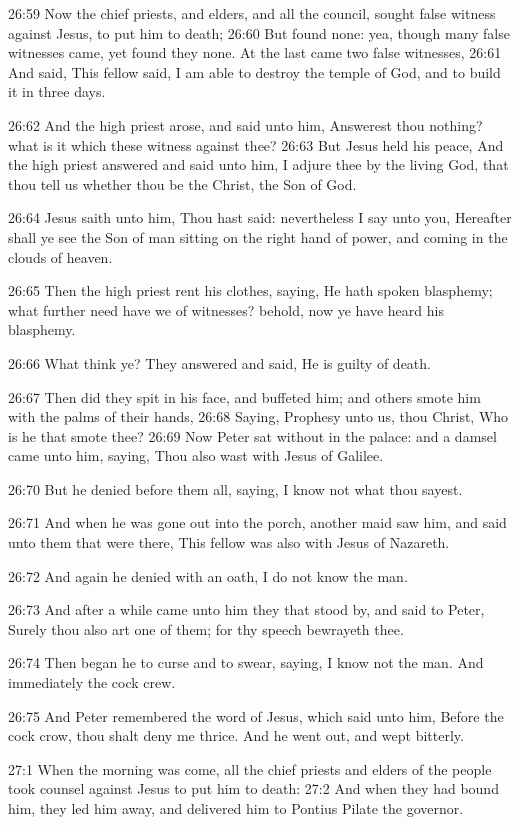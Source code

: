 26:59 Now the chief priests, and elders, and all the council, sought
false witness against Jesus, to put him to death; 26:60 But found
none: yea, though many false witnesses came, yet found they none. At
the last came two false witnesses, 26:61 And said, This fellow said, I
am able to destroy the temple of God, and to build it in three days.

26:62 And the high priest arose, and said unto him, Answerest thou
nothing? what is it which these witness against thee?  26:63 But Jesus
held his peace, And the high priest answered and said unto him, I
adjure thee by the living God, that thou tell us whether thou be the
Christ, the Son of God.

26:64 Jesus saith unto him, Thou hast said: nevertheless I say unto
you, Hereafter shall ye see the Son of man sitting on the right hand
of power, and coming in the clouds of heaven.

26:65 Then the high priest rent his clothes, saying, He hath spoken
blasphemy; what further need have we of witnesses? behold, now ye have
heard his blasphemy.

26:66 What think ye? They answered and said, He is guilty of death.

26:67 Then did they spit in his face, and buffeted him; and others
smote him with the palms of their hands, 26:68 Saying, Prophesy unto
us, thou Christ, Who is he that smote thee?  26:69 Now Peter sat
without in the palace: and a damsel came unto him, saying, Thou also
wast with Jesus of Galilee.

26:70 But he denied before them all, saying, I know not what thou
sayest.

26:71 And when he was gone out into the porch, another maid saw him,
and said unto them that were there, This fellow was also with Jesus of
Nazareth.

26:72 And again he denied with an oath, I do not know the man.

26:73 And after a while came unto him they that stood by, and said to
Peter, Surely thou also art one of them; for thy speech bewrayeth
thee.

26:74 Then began he to curse and to swear, saying, I know not the man.
And immediately the cock crew.

26:75 And Peter remembered the word of Jesus, which said unto him,
Before the cock crow, thou shalt deny me thrice. And he went out, and
wept bitterly.

27:1 When the morning was come, all the chief priests and elders of
the people took counsel against Jesus to put him to death: 27:2 And
when they had bound him, they led him away, and delivered him to
Pontius Pilate the governor.


